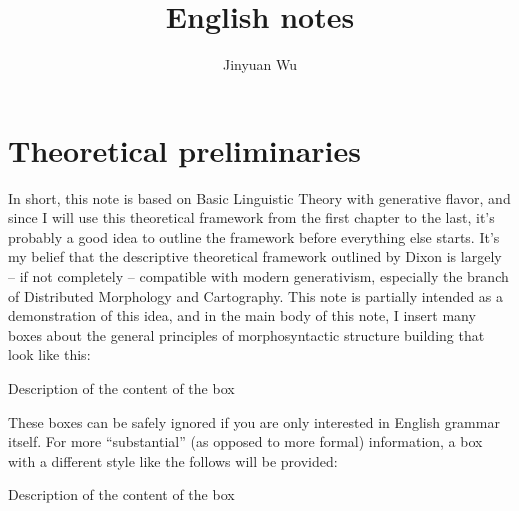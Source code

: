 \documentclass[UTF8, a4paper, oneside, scheme=plain]{ctexrep}
\title{English notes}
\author{Jinyuan Wu}
\begin{document}
    
\maketitle

\automath

\tableofcontents

\chapter*{Theoretical preliminaries}

In short, this note is based on Basic Linguistic Theory \citep{dixon2009basic1,dixon2010basic2,dixon2012basic3}
with generative flavor,
and since I will use this theoretical framework from the first chapter to the last,
it's probably a good idea to outline the framework before everything else starts.
It's my belief that the descriptive theoretical framework outlined by Dixon 
is largely -- if not completely -- compatible with modern generativism,
especially the branch of Distributed Morphology and Cartography.
This note is partially intended as a demonstration of this idea,
and in the main body of this note, 
I insert many boxes about the general principles of morphosyntactic structure building 
that look like this:
\begin{theorybox*}{Description of the content of the box}
\end{theorybox*}
These boxes can be safely ignored if you are only interested in English grammar itself.
For more ``substantial'' (as opposed to more formal) information,
a box with a different style like the follows will be provided:

\begin{infobox*}{Description of the content of the box}
\end{infobox*}
\end{document}
